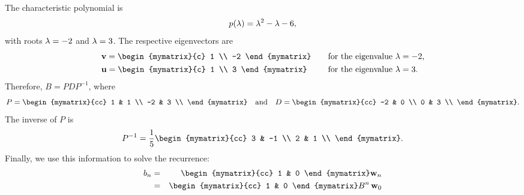 \begin{solution}
  The characteristic polynomial is
  \begin{equation*}
    p(\lambda) = \lambda^2 - \lambda - 6,
  \end{equation*}
  with roots $\lambda=-2$ and $\lambda=3$. The respective eigenvectors
  are 
  \begin{equation*}
    \begin{array}{ll}
      \vect{v} = \begin{mymatrix}{c} 1 \\ -2 \end{mymatrix}
        &\quad\mbox{for the eigenvalue $\eigenvar=-2$,}\\\\[-2ex]
      \vect{u} = \begin{mymatrix}{c} 1 \\ 3 \end{mymatrix}
        &\quad\mbox{for the eigenvalue $\eigenvar=3$.}
    \end{array}
  \end{equation*}
  Therefore, $B = PDP^{-1}$, where
  \begin{equation*}
    P = \begin{mymatrix}{cc}
      1 & 1 \\
      -2 & 3 \\
    \end{mymatrix}
    \quad\mbox{and}\quad
    D = \begin{mymatrix}{cc}
      -2 & 0 \\
      0 & 3 \\
    \end{mymatrix}.
  \end{equation*}
  The inverse of $P$ is
  \begin{equation*}
    P^{-1} =
    \frac{1}{5}
    \begin{mymatrix}{cc}
      3 & -1 \\
      2 &  1 \\
    \end{mymatrix}.
  \end{equation*}
  Finally, we use this information to solve the recurrence:
  \begin{eqnarray*}
    b_n
    &=& \begin{mymatrix}{cc} 1 & 0 \end{mymatrix}\vect{w}_n \\
    &=& \begin{mymatrix}{cc} 1 & 0 \end{mymatrix}B^n\,\vect{w}_0 \\

\end{eqnarray*}
\end{solution}
